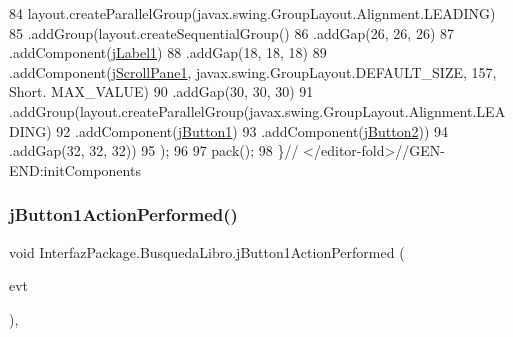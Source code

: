 \begin{DoxyCode}
84             layout.createParallelGroup(javax.swing.GroupLayout.Alignment.LEADING)
85             .addGroup(layout.createSequentialGroup()
86                 .addGap(26, 26, 26)
87                 .addComponent(\mbox{\hyperlink{class_interfaz_package_1_1_busqueda_libro_ae9603cba787d7c8cd78d9a35ac7c31ab}{jLabel1}})
88                 .addGap(18, 18, 18)
89                 .addComponent(\mbox{\hyperlink{class_interfaz_package_1_1_busqueda_libro_a2c5f99da1566043c6ead6bf6bc702bfa}{jScrollPane1}}, javax.swing.GroupLayout.DEFAULT\_SIZE, 157, Short.
      MAX\_VALUE)
90                 .addGap(30, 30, 30)
91                 .addGroup(layout.createParallelGroup(javax.swing.GroupLayout.Alignment.LEADING)
92                     .addComponent(\mbox{\hyperlink{class_interfaz_package_1_1_busqueda_libro_a8bd603a21b300bd0b31210ae9756c361}{jButton1}})
93                     .addComponent(\mbox{\hyperlink{class_interfaz_package_1_1_busqueda_libro_a1cb7663746354ace608d7846c3d86105}{jButton2}}))
94                 .addGap(32, 32, 32))
95         );
96 
97         pack();
98     \}\textcolor{comment}{// </editor-fold>//GEN-END:initComponents}
\end{DoxyCode}
\mbox{\label{class_interfaz_package_1_1_busqueda_libro_a25a437966d236ff48463e2ce6a5d9c03}} 
\subsubsection{\texorpdfstring{j\+Button1\+Action\+Performed()}{jButton1ActionPerformed()}}
{\footnotesize\ttfamily void Interfaz\+Package.\+Busqueda\+Libro.\+j\+Button1\+Action\+Performed (\begin{DoxyParamCaption}\item[{java.\+awt.\+event.\+Action\+Event}]{evt }\end{DoxyParamCaption})\hspace{0.3cm}{\ttfamily [inline]}, {\ttfamily [private]}}


